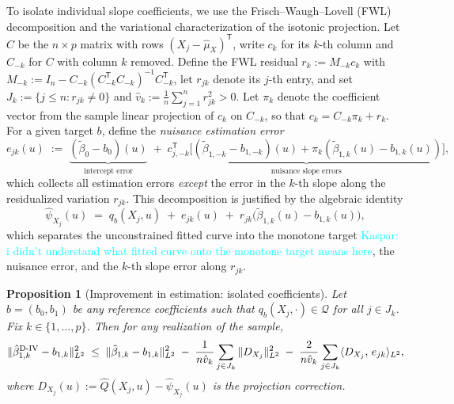 \documentclass[12pt]{article}
\newcommand{\kw}[1]{\textcolor{cyan}{Kaspar: #1}}
\newcommand{\T}{\mathsf{T}} %
\newcommand{\est}{\ensuremath{\textnormal{D-IV}}\xspace}
\newtheorem{proposition}{Proposition}
\begin{document}
To isolate individual slope coefficients, we use the Frisch--Waugh--Lovell (FWL) decomposition and the variational characterization of the isotonic projection. Let $C$ be the $n\times p$ matrix with rows $(X_j-\hat\mu_X)^{\!\T}$, write $c_k$ for its $k$-th column and $C_{-k}$ for $C$ with column $k$ removed. Define the FWL residual $r_k:=M_{-k}c_k$ with $M_{-k}:=I_n-C_{-k}(C_{-k}^{\!\T} C_{-k})^{-1}C_{-k}^{\!\T}$, let $r_{jk}$ denote its $j$-th entry, and set $J_k:=\{j\le n:r_{jk}\neq 0\}$ and $\hat v_k:=\frac{1}{n}\sum_{j=1}^n r_{jk}^2>0$. Let $\pi_k$ denote the coefficient vector from the sample linear projection of $c_k$ on $C_{-k}$, so that $c_k=C_{-k}\pi_k+r_k$. For a given target $b$, define the \emph{nuisance estimation error}
\begin{equation}\label{eq:ejk}
e_{jk}(u)
\;:=\;
\underbrace{(\tilde\beta_0-b_0)(u)}_{\text{intercept error}}
\;+\;
\underbrace{c_{j,-k}^{\!\T}
\bigl[
(\tilde\beta_{1,-k}-b_{1,-k})(u)+\pi_k(\tilde\beta_{1,k}(u)-b_{1,k}(u))
\bigr]}_{\text{nuisance slope errors}},
\end{equation}
which collects all estimation errors \emph{except} the error in the $k$-th slope along the residualized variation $r_{jk}$. This decomposition is justified by the algebraic identity
\begin{equation}\label{eq:decomp_identity}
\hat\psi_{X_j}(u)
\;=\;
q_b(X_j,u)\;+\;e_{jk}(u)\;+\;r_{jk}\bigl(\tilde\beta_{1,k}(u)-b_{1,k}(u)\bigr),
\end{equation}
which separates the unconstrained fitted curve into the monotone target \kw{i didn't understand what fitted curve onto the monotone target means here}, the nuisance error, and the $k$-th slope error along $r_{jk}$.


\begin{proposition}[Improvement in estimation: isolated coefficients]\label{prop:coord_improvement}
Let $b=(b_0,b_1)$ be any reference coefficients such that $q_b(X_j,\cdot)\in\mathcal Q$ for all $j\in J_k$. Fix $k\in\{1,\ldots,p\}$. Then for any realization of the sample,
\begin{equation}\label{eq:coord_bound_general}
\|\hat\beta_{1,k}^{\est}-b_{1,k}\|_{L^2}^2
\;\le\;
\|\tilde\beta_{1,k}-b_{1,k}\|_{L^2}^2
\;-\;\frac{1}{n\hat v_k}\sum_{j\in J_k}\|D_{X_j}\|_{L^2}^2
\;-\;\frac{2}{n\hat v_k}\sum_{j\in J_k}\langle D_{X_j},\, e_{jk}\rangle_{L^2},
\end{equation}
where $D_{X_j}(u):=\hat{Q}(X_j,u)-\hat\psi_{X_j}(u)$ is the projection correction.
\end{proposition}
\end{document}
